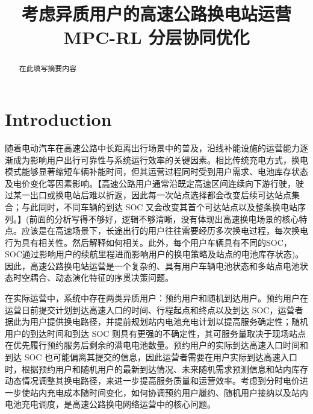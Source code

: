 \documentclass[12pt,a4paper,UTF8]{ctexart}
\begin{document}
\cover

\newpage
\begin{abstract}

在此填写摘要内容

\end{abstract}
\newpage

\thispagestyle{empty} %

\newpage
\tableofcontents

\newpage

\begin{center}
   \title{ \Huge \textbf{{考虑异质用户的高速公路换电站运营 MPC-RL 分层协同优化}}}
\end{center}


\section{Introduction}
随着电动汽车在高速公路中长距离出行场景中的普及，沿线补能设施的运营能力逐渐成为影响用户出行可靠性与系统运行效率的关键因素。相比传统充电方式，换电模式能够显著缩短车辆补能时间，但其运营过程同时受到用户需求、电池库存状态及电价变化等因素影响。【高速公路用户通常沿既定高速区间连续向下游行驶，驶过某一出口或换电站后难以折返，因此每一次站点选择都会改变后续可达站点集合；与此同时，不同车辆的到达 SOC 又会改变其首个可达站点以及整条换电站序列。】(前面的分析写得不够好，逻辑不够清晰，没有体现出高速换电场景的核心特点。应该是在高速场景下，长途出行的用户往往需要经历多次换电过程，每次换电行为具有相关性。然后解释如何相关。此外，每个用户车辆具有不同的SOC，SOC通过影响用户的续航里程进而影响用户的换电策略及站点的电池库存状态)。因此，高速公路换电站运营是一个复杂的、具有用户车辆电池状态和多站点电池状态时空耦合、动态演化特征的序贯决策问题。

在实际运营中，系统中存在两类异质用户：预约用户和随机到达用户。预约用户在运营日前提交计划到达高速入口的时间、行程起点和终点以及到达 SOC，运营者据此为用户提供换电路径，并提前规划站内电池充电计划以提高服务确定性；随机用户的到达时间和到达 SOC 则具有更强的不确定性，其可服务量取决于现场站点在优先履行预约服务后剩余的满电电池数量。预约用户的实际到达高速入口时间和到达 SOC 也可能偏离其提交的信息，因此运营者需要在用户实际到达高速入口时，根据预约用户和随机用户的最新到达情况、未来随机需求预测信息和站内库存动态情况调整其换电路径，来进一步提高服务质量和运营效率。考虑到分时电价进一步使站内充电成本随时间变化，如何协调预约用户履约、随机用户接纳以及站内电池充电调度，是高速公路换电网络运营中的核心问题。
\end{document}
